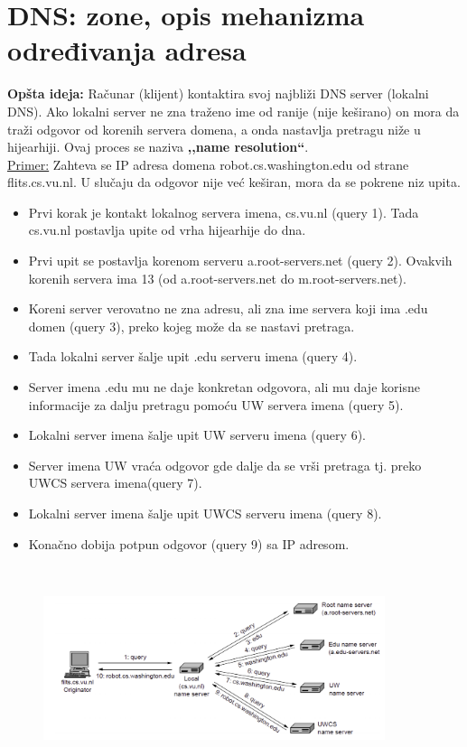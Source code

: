 \documentclass[a4paper]{article}
\begin{document}
\section{DNS: zone, opis mehanizma određivanja adresa}
    \textbf{Opšta ideja:} Računar (klijent) kontaktira svoj najbliži DNS server (lokalni DNS).
    Ako lokalni server ne zna traženo ime od ranije (nije keširano) on mora da traži odgovor od korenih
    servera domena, a onda nastavlja pretragu niže u hijearhiji. Ovaj proces se naziva 
    \textbf{,,name resolution``}.\\

    \underline{Primer:} Zahteva se IP adresa domena robot.cs.washington.edu 
    od strane flits.cs.vu.nl.
    U slučaju da odgovor nije već keširan, mora da se pokrene niz upita. 
    \begin{itemize}
        \item Prvi korak je kontakt lokalnog servera imena, cs.vu.nl (query 1). 
              Tada cs.vu.nl postavlja upite od vrha hijearhije do dna. 
        \item Prvi upit se postavlja korenom serveru a.root-servers.net (query 2). 
              Ovakvih korenih servera ima 13 (od a.root-servers.net do m.root-servers.net). 
        \item Koreni server verovatno ne zna adresu, ali zna ime servera koji ima .edu domen (query 3),
              preko kojeg može da se nastavi pretraga. 
        \item Tada lokalni server šalje upit .edu serveru imena (query 4).
        \item Server imena .edu mu ne daje konkretan odgovora, ali mu daje korisne informacije 
              za dalju pretragu pomoću UW servera imena (query 5). 
        \item Lokalni server imena šalje upit UW serveru imena (query 6).
        \item Server imena UW vraća odgovor gde dalje da se vrši pretraga tj. preko UWCS servera 
              imena(query 7).
        \item Lokalni server imena šalje upit UWCS serveru imena (query 8). 
        \item Konačno dobija potpun odgovor (query 9) sa IP adresom. 
    \end{itemize}
    \begin{figure}[H]
        \begin{center}
            \includegraphics[width=100mm,height=60mm]{Slike/dns4.png}
        \end{center}
    \end{figure}
\end{document}
